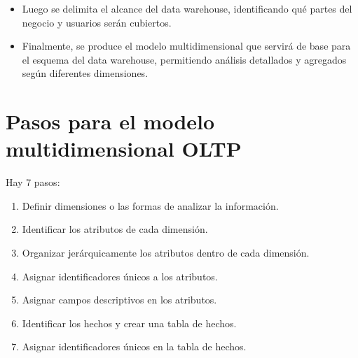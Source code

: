 \documentclass[11pt,letterpaper]{article}
\begin{document}
	\begin{itemize}
		\item Luego se delimita el alcance del data warehouse, identificando qué partes del negocio y usuarios serán cubiertos.
    \end{itemize}

	\begin{itemize}
		\item Finalmente, se produce el modelo multidimensional que servirá de base para el esquema del data warehouse, permitiendo análisis detallados y agregados según diferentes dimensiones.
	\end{itemize}

\section{Pasos para el modelo multidimensional OLTP}
Hay 7 pasos:

\begin{enumerate}
	\item Definir dimensiones o las formas de analizar la información.
	\item Identificar los atributos de cada dimensión.
	\item Organizar jerárquicamente los atributos dentro de cada dimensión.
	\item Asignar identificadores únicos a los atributos.
	\item Asignar campos descriptivos en los atributos.
	\item Identificar los hechos y crear una tabla de hechos.
	\item Asignar identificadores únicos en la tabla de hechos.
\end{enumerate}
\end{document}
